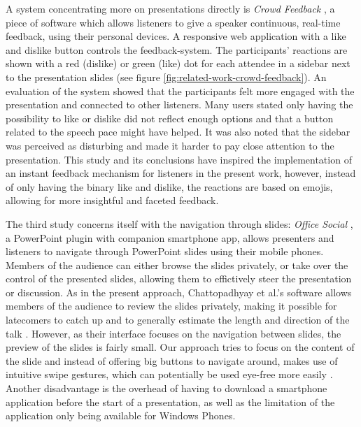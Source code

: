 A system concentrating more on presentations directly is \emph{Crowd Feedback} \cite{Teevan:MobileFeedbackDuringPresentation}, a piece of software which allows listeners to give a speaker continuous, real-time feedback, using their personal devices. A responsive web application with a like and dislike button controls the feedback-system. The participants' reactions are shown with a red (dislike) or green (like) dot for each attendee in a sidebar next to the presentation slides (see figure \ref{fig:related-work-crowd-feedback}). An evaluation of the system showed that the participants felt more engaged with the presentation and connected to other listeners. Many users stated only having the possibility to like or dislike did not reflect enough options and that a button related to the speech pace might have helped. It was also noted that the sidebar was perceived as disturbing and made it harder to pay close attention to the presentation. This study and its conclusions have inspired the implementation of an instant feedback mechanism for listeners in the present work, however, instead of only having the binary like and dislike, the reactions are based on emojis, allowing for more insightful and faceted feedback.

The third study concerns itself with the navigation through slides: \emph{Office Social} \cite{Chattopadhyay:OfficeSocialRemoteControl}, a PowerPoint plugin with companion smartphone app, allows presenters and listeners to navigate through PowerPoint slides using their mobile phones. Members of the audience can either browse the slides privately, or take over the control of the presented slides, allowing them to effictively steer the presentation or discussion. As in the present approach, Chattopadhyay et al.'s software allows members of the audience to review the slides privately, making it possible for latecomers to catch up and to generally estimate the length and direction of the talk \cite{Chattopadhyay:OfficeSocialRemoteControl}. However, as their interface focuses on the navigation between slides, the preview of the slides is fairly small. Our approach tries to focus on the content of the slide and instead of offering big buttons to navigate around, makes use of intuitive swipe gestures, which can potentially be used eye-free more easily \cite{Negulescu:TapSwipeMove}. Another disadvantage is the overhead of having to download a smartphone application before the start of a presentation, as well as the limitation of the application only being available for Windows Phones.

